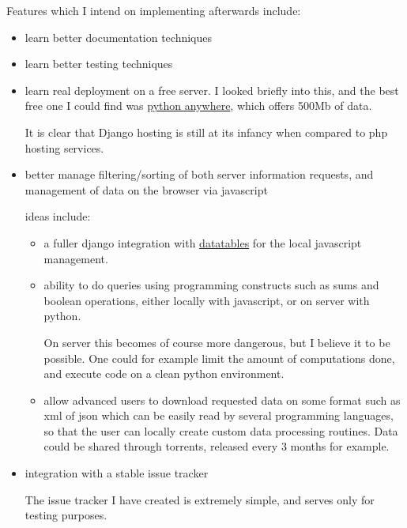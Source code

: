 \documentclass[12pt]{article}
\begin{document}
Features which I intend on implementing afterwards include:

\begin{itemize}

  \item learn better documentation techniques

  \item learn better testing techniques
  
  \item learn real deployment on a free server. I looked briefly into this, and the best
    free one I could find was \href{https://www.pythonanywhere.com/}{python anywhere},
    which offers 500Mb of data.
    
    It is clear that Django hosting is still at its infancy when compared to php hosting
    services.

  \item better manage filtering/sorting of both server information requests,
    and management of data on the browser via javascript
    
    ideas include:
    
    \begin{itemize}
      \item a fuller django integration with \href{http://www.datatables.net}{datatables} for the
        local javascript management.
        
      \item ability to do queries using programming constructs such as sums and boolean operations,
        either locally with javascript, or on server with python.
        
        On server this becomes of course more dangerous, but I believe it to be possible. One could
        for example limit the amount of computations done, and execute code on a clean python environment.
      
      \item allow advanced users to download requested data on some
        format such as xml of json which can be easily read by several programming languages,
        so that the user can locally create custom data processing routines. Data could be shared
        through torrents, released every 3 months for example.
    \end{itemize}

  \item integration with a stable issue tracker
  
    The issue tracker I have created is extremely simple, and serves
    only for testing purposes.
    

\end{itemize}
\end{document}
